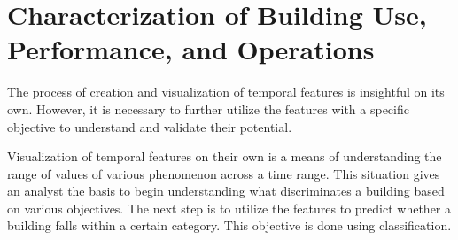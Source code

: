 \section{Characterization of Building Use, Performance, and Operations}
\label{sec:characterization}

The process of creation and visualization of temporal features is insightful on its own. However, it is necessary to further utilize the features with a specific objective to understand and validate their potential. 

Visualization of temporal features on their own is a means of understanding the range of values of various phenomenon across a time range. This situation gives an analyst the basis to begin understanding what discriminates a building based on various objectives. The next step is to utilize the features to predict whether a building falls within a certain category. This objective is done using classification.